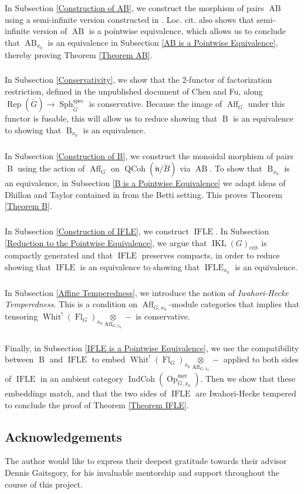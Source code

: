 \documentclass[10pt,a4paper]{amsart}
\newcommand{\on}[1]{\operatorname{#1}}
\newcommand{\IKL}{\on{IKL}(G)_{\on{crit}}}
\newcommand{\Gcheck}{\check{G}}
\newcommand{\ncheck}{\check{\mathfrak{n}}}
\newcommand{\Bcheck}{\check{B}}
\newcommand{\sssec}[1]{\subsubsection{}}
\begin{document}
\sssec{}
In Subsection \ref{Construction of AB}, we construct the morphism of pairs $\on{AB}$ using a semi-infinite version constructed in \cite{GLC3}. Loc. cit. also shows that semi-infinite version of $\on{AB}$ is a pointwise equivalence, which allows us to conclude that $\on{AB}_{x_0}$ is an equivalence in Subsection \ref{AB is a Pointwise Equivalence}, thereby proving Theorem \ref{Theorem AB}.

\sssec{}
In Subsection \ref{Conservativity}, we show that the 2-functor of factorization restriction, defined in the unpublished document \cite{CF} of Chen and Fu, along $\on{Rep}(\Gcheck) \longrightarrow \on{Sph}_{\Gcheck}^{\on{spec}}$ is conservative. Because the image of $\on{Aff}_G$ under this functor is fusable, this will allow us to reduce showing that $\on{B}$ is an equivalence to showing that $\on{B}_{x_0}$ is an equivalence.

\sssec{}
In Subsection \ref{Construction of B}, we construct the monoidal morphism of pairs $\on{B}$ using the action of $\on{Aff}_G$ on $\on{QCoh}(\ncheck/\Bcheck)$ via $\on{AB}$. To show that $\on{B}_{x_0}$ is an equivalence, in Subsection \ref{B is a Pointwise Equivalence} we adapt ideas of Dhillon and Taylor contained in \cite{DT} from the Betti setting. This proves Theorem \ref{Theorem B}.

\sssec{}
In Subsection \ref{Construction of IFLE}, we construct $\on{IFLE}$. In Subsection \ref{Reduction to the Pointwise Equivalence}, we argue that $\IKL$ is compactly generated and that $\on{IFLE}$ preserves compacts, in order to reduce showing that $\on{IFLE}$ is an equivalence to showing that $\on{IFLE}_{x_0}$ is an equivalence.

\sssec{}
In Subsection \ref{Affine Temperedness}, we introduce the notion of \emph{Iwahori-Hecke Temperedness}. This is a condition on $\on{Aff}_{G, x_0}$-module categories that implies that tensoring $\on{Whit}^!(\on{Fl}_G)_{x_0} \underset{\on{Aff}_{G, x_0}}{\otimes} -$ is conservative.

\sssec{}
Finally, in Subsection \ref{IFLE is a Pointwise Equivalence}, we use the compatibility between $\on{B}$ and $\on{IFLE}$ to embed $\on{Whit}^!(\on{Fl}_G)_{x_0} \underset{\on{Aff}_{G, x_0}}{\otimes} -$ applied to both sides of $\on{IFLE}$ in an ambient category $\on{IndCoh}(\on{Op}_{\Gcheck, x_0}^{\on{mer}})$. Then we show that these embeddings match, and that the two sides of $\on{IFLE}$ are Iwahori-Hecke tempered to conclude the proof of Theorem \ref{Theorem IFLE}.


\subsection{Acknowledgements}
The author would like to express their deepest gratitude towards their advisor Dennis Gaitsgory, for his invaluable mentorship and support throughout the course of this project.
\end{document}
